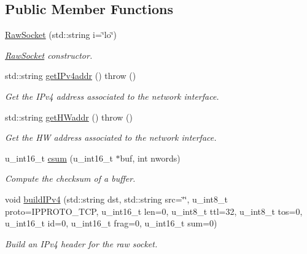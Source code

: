 \subsection*{Public Member Functions}
\begin{CompactItemize}
\item 
\hyperlink{classusock_1_1RawSocket_d476598f4a6db6d3cf28673172eb1b8b}{RawSocket} (std::string i=\char`\"{}lo\char`\"{})
\begin{CompactList}\small\item\em \hyperlink{classusock_1_1RawSocket}{RawSocket} constructor. \item\end{CompactList}\item 
std::string \hyperlink{classusock_1_1RawSocket_3b0c8f2f539982c8f37a66ebc29746a0}{getIPv4addr} ()  throw ()
\begin{CompactList}\small\item\em Get the IPv4 address associated to the network interface. \item\end{CompactList}\item 
std::string \hyperlink{classusock_1_1RawSocket_1276f5fcc7bc3b41d9d11055887ab7a9}{getHWaddr} ()  throw ()
\begin{CompactList}\small\item\em Get the HW address associated to the network interface. \item\end{CompactList}\item 
u\_\-int16\_\-t \hyperlink{classusock_1_1RawSocket_11c89cceced7302fe25163fbc74a6b83}{csum} (u\_\-int16\_\-t $\ast$buf, int nwords)
\begin{CompactList}\small\item\em Compute the checksum of a buffer. \item\end{CompactList}\item 
void \hyperlink{classusock_1_1RawSocket_999a433a049b33006ab8c26a7d0875b9}{buildIPv4} (std::string dst, std::string src=\char`\"{}\char`\"{}, u\_\-int8\_\-t proto=IPPROTO\_\-TCP, u\_\-int16\_\-t len=0, u\_\-int8\_\-t ttl=32, u\_\-int8\_\-t tos=0, u\_\-int16\_\-t id=0, u\_\-int16\_\-t frag=0, u\_\-int16\_\-t sum=0)
\begin{CompactList}\small\item\em Build an IPv4 header for the raw socket. \item\end{CompactList}\item 

\end{CompactItemize}
